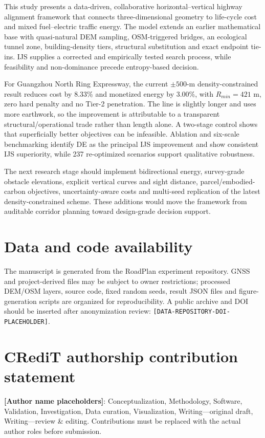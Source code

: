 \documentclass[preprint,12pt]{elsarticle}
\begin{document}
This study presents a data-driven, collaborative horizontal--vertical highway alignment framework that connects three-dimensional geometry to life-cycle cost and mixed fuel--electric traffic energy. The model extends an earlier mathematical base with quasi-natural DEM sampling, OSM-triggered bridges, an ecological tunnel zone, building-density tiers, structural substitution and exact endpoint tie-ins. IJS supplies a corrected and empirically tested search process, while feasibility and non-dominance precede entropy-based decision.

For Guangzhou North Ring Expressway, the current $\pm500$-m density-constrained result reduces cost by 8.33\% and monetized energy by 3.00\%, with $R_{min}=421$ m, zero hard penalty and no Tier-2 penetration. The line is slightly longer and uses more earthwork, so the improvement is attributable to a transparent structural/operational trade rather than length alone. A two-stage control shows that superficially better objectives can be infeasible. Ablation and six-scale benchmarking identify DE as the principal IJS improvement and show consistent IJS superiority, while 237 re-optimized scenarios support qualitative robustness.

The next research stage should implement bidirectional energy, survey-grade obstacle elevations, explicit vertical curves and sight distance, parcel/embodied-carbon objectives, uncertainty-aware costs and multi-seed replication of the latest density-constrained scheme. These additions would move the framework from auditable corridor planning toward design-grade decision support.

\section*{Data and code availability}
The manuscript is generated from the RoadPlan experiment repository. GNSS and project-derived files may be subject to owner restrictions; processed DEM/OSM layers, source code, fixed random seeds, result JSON files and figure-generation scripts are organized for reproducibility. A public archive and DOI should be inserted after anonymization review: \nolinkurl{[DATA-REPOSITORY-DOI-PLACEHOLDER]}.

\section*{CRediT authorship contribution statement}
\textbf{[Author name placeholders]}: Conceptualization, Methodology, Software, Validation, Investigation, Data curation, Visualization, Writing---original draft, Writing---review \& editing. Contributions must be replaced with the actual author roles before submission.
\end{document}
